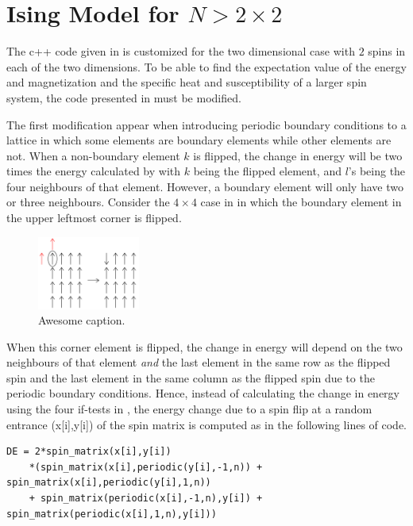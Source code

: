 \section{Ising Model for $N>2\times 2$}
\label{sec:IsingModelNgreater}
The c++ code given in  is customized for the two dimensional case with $2$ spins in each of the two dimensions. 
To be able to find the expectation value of the energy and magnetization and the specific heat and susceptibility of a larger spin system, the code presented in  must be modified.

The first modification appear when introducing periodic boundary conditions to a lattice in which some elements are boundary elements while other elements are not. 
When a non-boundary element $k$ is flipped, the change in energy will be two times the energy calculated by  with $k$ being the flipped element, and $l$'s being the four neighbours of that element. 
However, a boundary element will only have two or three neighbours. 
Consider the $4\times 4$ case in  in which the boundary element in the upper leftmost corner is flipped.  
\begin{figure}[H]
	\centering
	\includegraphics[width=0.3\textwidth]{Figures/BoundaryConditions.png}
	\caption{Awesome caption.}
	\label{fig:BoundaryConditionExample}
\end{figure}   
When this corner element is flipped, the change in energy will depend on the two neighbours of that element \textit{and} the last element in the same row as the flipped spin and the last element in the same column as the flipped spin due to the periodic boundary conditions.
Hence, instead of calculating the change in energy using the four if-tests in , the energy change due to a spin flip at a random entrance (x[i],y[i]) of the spin matrix is computed as in the following lines of code.
\begin{lstlisting}
DE = 2*spin_matrix(x[i],y[i])
	*(spin_matrix(x[i],periodic(y[i],-1,n)) + spin_matrix(x[i],periodic(y[i],1,n))
	+ spin_matrix(periodic(x[i],-1,n),y[i]) + spin_matrix(periodic(x[i],1,n),y[i]))
\end{lstlisting}
